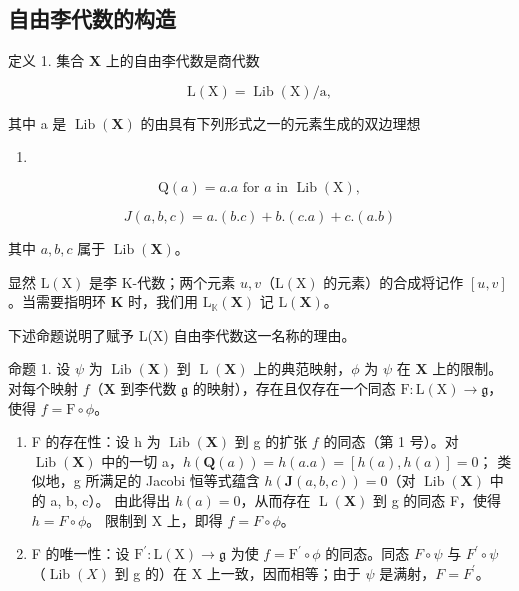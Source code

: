 \subsection{自由李代数的构造}

定义 1. 集合 \(\mathbf{X}\) 上的自由李代数是商代数

\[
\mathrm{L} (\mathrm{X}) = \operatorname{Lib} (\mathrm{X}) / \mathrm{a},
\]

其中 a 是 \(\operatorname{Lib}(\mathbf{X})\) 的由具有下列形式之一的元素生成的双边理想

\begin{enumerate}
\def\labelenumi{(\arabic{enumi})}
\tightlist
\item
\end{enumerate}

\[
\mathrm{Q} (a) = a. a \text {   for   } a \text {   in   } \operatorname{Lib} (\mathrm{X}),\tag{2}
\]

\[
J (a, b, c) = a. (b. c) + b. (c. a) + c. (a. b)
\]

其中 \(a, b, c\) 属于 \(\operatorname{Lib}(\mathbf{X})\)。

显然 \(\mathrm{L}(\mathrm{X})\) 是李 K-代数；两个元素 \(u, v\)（\(\mathrm{L}(\mathrm{X})\) 的元素）的合成将记作 \([u, v]\)。当需要指明环 \(\mathbf{K}\) 时，我们用 \(\mathrm{L}_{\mathbb{K}}(\mathbf{X})\) 记 \(\mathrm{L}(\mathbf{X})\)。

下述命题说明了赋予 L(X) 自由李代数这一名称的理由。

命题 1. 设 \(\psi\) 为 \(\operatorname{Lib}(\mathbf{X})\) 到 \(\operatorname{L}(\mathbf{X})\) 上的典范映射，\(\phi\) 为 \(\psi\) 在 \(\mathbf{X}\) 上的限制。对每个映射 \(f\)（\(\mathbf{X}\) 到李代数 \(\mathfrak{g}\) 的映射），存在且仅存在一个同态 \(\mathrm{F}:\mathrm{L}(\mathrm{X})\to \mathfrak{g}\)，使得 \(f = \mathrm{F}\circ \phi\)。

\begin{enumerate}
\def\labelenumi{(\alph{enumi})}
\item
  F 的存在性：设 h 为 \(\operatorname{Lib}(\mathbf{X})\) 到 g 的扩张 \(f\) 的同态（第 1 号）。对 \(\operatorname{Lib}(\mathbf{X})\) 中的一切 a，\(h(\mathbf{Q}(a)) = h(a.a) = [h(a), h(a)] = 0\)； 类似地，g 所满足的 Jacobi 恒等式蕴含 \(h(\mathbf{J}(a, b, c)) = 0\)（对 \(\operatorname{Lib}(\mathbf{X})\) 中的 a, b, c）。 由此得出 \(h(a) = 0\)，从而存在 \(\operatorname{L}(\mathbf{X})\) 到 g 的同态 F，使得 \(h = F \circ \phi\)。 限制到 X 上，即得 \(f = F \circ \phi\)。
\item
  F 的唯一性：设 \(\mathrm{F}^{\prime}:\mathrm{L}(\mathrm{X})\to\mathfrak{g}\) 为使 \(f=\mathrm{F}^{\prime}\circ\phi\) 的同态。同态 \(F\circ\psi\) 与 \(F^{\prime}\circ\psi\)（\(\operatorname{Lib}(X)\) 到 g 的）在 X 上一致，因而相等；由于 \(\psi\) 是满射，\(F=F^{\prime}\)。
\end{enumerate}

